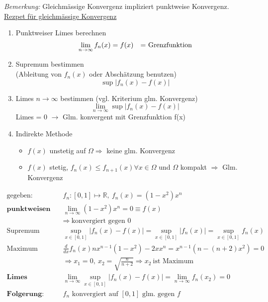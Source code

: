 \emph{Bemerkung:} Gleichm{\"a}ssige Konvergenz impliziert punktweise Konvergenz.\\
\underline{Rezpet f{\"u}r gleichm{\"a}ssige Konvergenz} 
\begin{enumerate}[label=(\roman*), noitemsep,topsep=0pt]
	\item Punktweiser Limes berechnen
	\[
	\lim_{n\rightarrow\infty}f_n(x) = f(x) \text{\quad = Grenzfunktion}
	\]
	\item Supremum bestimmen \\
	(Ableitung von $f_n(x)$  oder Absch{\"a}tzung benutzen)
	\[
	\sup|f_n(x) - f(x)|
	\]
	\item Limes $n \to \infty$ bestimmen (vgl. Kriterium glm. Konvergenz)
	\[
	\lim_{n\rightarrow\infty} \sup|f_n(x) - f(x)|
	\]
	Limes = 0 $\rightarrow$ Glm. konvergent mit Grenzfunktion f(x)
	\item Indirekte Methode \\
	\begin{itemize}
		\item $f(x)$ unstetig  auf $\Omega \Rightarrow$ keine glm. Konvergenz	
		\item $f(x)$ stetig, $f_n(x) \leq f_{n+1}(x) \forall x \in \Omega $ und $\Omega$ kompakt $\Rightarrow$ Glm. Konvergenz
	\end{itemize}
	
\end{enumerate}

\begin{equation*}
	\begin{split}
		\text{gegeben:} \quad & f_n:[0,1] \mapsto \mathbb{R},\ f_n(x) = (1 - x^2)x^n \\
		\textbf{punktweisen Limes berechnen:} \quad & \lim_{n \to \infty} (1 - x^2)x^n = 0 \equiv f(x) \\
		& \Rightarrow\ \text{konvergiert gegen 0} \\
		\text{Supremum berechnen:} \quad & \sup_{x \in [0,1]} |f_n(x) -f(x)| = \sup_{x \in [0,1]} |f_n(x)| = \sup_{x \in [0,1]}f_n(x) \\
		\text{Maximum finden:} \quad & \frac{d}{dx} f_n(x) nx^{n-1}(1-x^2)-2xx^n = x^{n-1}(n - (n+2)x^2) = 0 \\
		& \Rightarrow x_1 = 0,\ x_2 = \sqrt{\frac{n}{n+2}} \Rightarrow x_2\ \text{ist Maximum} \\
		\textbf{Limes berechnen:} \quad & \lim_{n \to \infty} \sup_{x \in [0,1]} |f_n(x) - f(x)| = \lim_{n \to \infty} f_n(x_2) = 0 \\
		\textbf{Folgerung:} \quad & \text{$f_n$ konvergiert auf $[0,1]$ glm. gegen $f$}
	\end{split}
\end{equation*}
